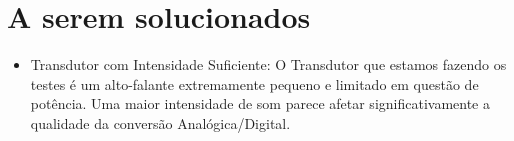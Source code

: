 \documentclass[12pt,a4paper]{report}
\begin{document}
	\section{A serem solucionados}
	
	\begin{itemize}
		\item Transdutor com Intensidade Suficiente:
		O Transdutor que estamos fazendo os testes é um alto-falante extremamente pequeno e limitado em questão de potência. Uma maior intensidade de som parece afetar significativamente a qualidade da conversão Analógica/Digital.
	\end{itemize}
	
	
\end{document}
